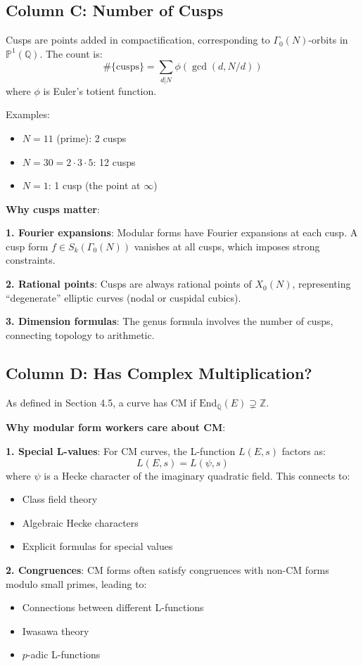 \documentclass[11pt]{article}
\begin{document}
\subsection{Column C: Number of Cusps}

Cusps are points added in compactification, corresponding to $\Gamma_0(N)$-orbits in $\mathbb{P}^1(\mathbb{Q})$. The count is:
$$\#\{\text{cusps}\} = \sum_{d | N} \phi(\gcd(d, N/d))$$
where $\phi$ is Euler's totient function.

Examples:
\begin{itemize}
\item $N = 11$ (prime): 2 cusps
\item $N = 30 = 2 \cdot 3 \cdot 5$: 12 cusps
\item $N = 1$: 1 cusp (the point at $\infty$)
\end{itemize}

\textbf{Why cusps matter}:

\textbf{1. Fourier expansions}: Modular forms have Fourier expansions at each cusp. A cusp form $f \in S_k(\Gamma_0(N))$ vanishes at all cusps, which imposes strong constraints.

\textbf{2. Rational points}: Cusps are always rational points of $X_0(N)$, representing ``degenerate'' elliptic curves (nodal or cuspidal cubics).

\textbf{3. Dimension formulas}: The genus formula involves the number of cusps, connecting topology to arithmetic.

\subsection{Column D: Has Complex Multiplication?}

As defined in Section 4.5, a curve has CM if $\text{End}_{\overline{\mathbb{Q}}}(E) \supsetneq \mathbb{Z}$.

\textbf{Why modular form workers care about CM}:

\textbf{1. Special L-values}: For CM curves, the L-function $L(E, s)$ factors as:
$$L(E, s) = L(\psi, s)$$
where $\psi$ is a Hecke character of the imaginary quadratic field. This connects to:
\begin{itemize}
\item Class field theory
\item Algebraic Hecke characters
\item Explicit formulas for special values
\end{itemize}

\textbf{2. Congruences}: CM forms often satisfy congruences with non-CM forms modulo small primes, leading to:
\begin{itemize}
\item Connections between different L-functions
\item Iwasawa theory
\item $p$-adic L-functions
\end{itemize}
\end{document}

